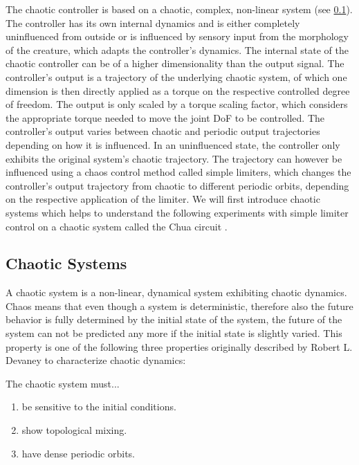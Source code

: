 \documentclass[main]{subfiles}
\begin{document}
The chaotic controller is based on a chaotic, complex, non-linear system (see \ref{subsec:chaotic-systems}). %
%
The controller has its own internal dynamics and is either completely uninfluenced from outside or is influenced by sensory input from the morphology of the creature, which adapts the controller's dynamics. %
%
The internal state of the chaotic controller can be of a higher dimensionality than the output signal. %
%
The controller's output is a trajectory of the underlying chaotic system, of which one dimension is then directly applied as a torque on the respective controlled degree of freedom. %
%
The output is only scaled by a torque scaling factor, which considers the appropriate torque needed to move the joint DoF to be controlled. %
%
The controller's output varies between chaotic and periodic output trajectories depending on how it is influenced. %
%
In an uninfluenced state, the controller only exhibits the original system's chaotic trajectory. %
%
The trajectory can however be influenced using a chaos control method called simple limiters, which changes the controller's output trajectory from chaotic to different periodic orbits, depending on the respective application of the limiter. %
%
We will first introduce chaotic systems which helps to understand the following experiments with simple limiter control on a chaotic system called the Chua circuit \cite{bib:Matsumoto1985}.

\subsection{Chaotic Systems}
\label{subsec:chaotic-systems}

A chaotic system is a non-linear, dynamical system exhibiting chaotic dynamics. %
%
Chaos means that even though a system is deterministic, therefore also the future behavior is fully determined by the initial state of the system, the future of the system can not be predicted any more if the initial state is slightly varied. %
%
This property is one of the following three properties originally described by Robert L. Devaney \cite{bib:Devaney1989} to characterize chaotic dynamics:

The chaotic system must...
\begin{enumerate}
\item be sensitive to the initial conditions.
\item show topological mixing.
\item have dense periodic orbits.
\end{enumerate}
\end{document}

